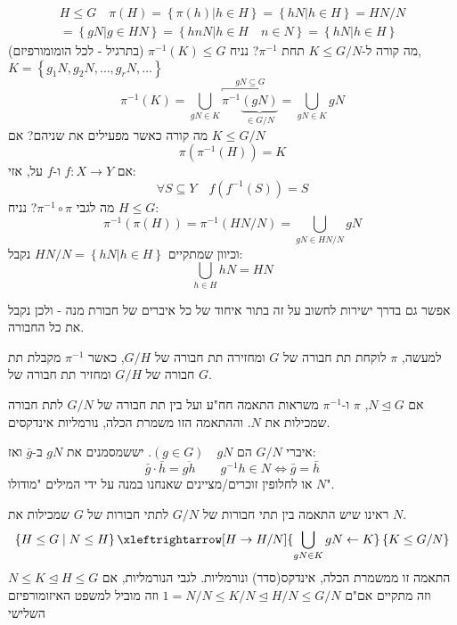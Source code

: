 \documentclass{tstextbook}
\begin{document}
$$\begin{gather}H\leq G\quad \pi(H)=\left\{  \pi(h)|h\in H  \right\}=\left\{  hN | h\in H  \right\}=HN / N  \\= \left\{  gN |g\in HN  \right\}= \left\{  hnN | h \in H\quad n\in N  \right\}=\left\{  hN|h\in H  \right\}
\end{gather}$$
מה קורה ל-\(K\leq G/N\) תחת \(\pi ^{-1}\)? נניח \(\pi ^{-1}(K)\leq G\) (בתרגיל - לכל הומומורפיזם), \(K=\left\{  g_{1}N,g_{2}N, \dots,g_{r}N, \dots  \right\}\)$$\pi ^{-1} (K)=\bigcup_{gN\in K} \overbracket{ \pi ^{-1} \underbrace{ (gN) }_{ \in G/N } }^{ gN\subseteq G }=\bigcup_{gN\in K}gN$$
מה קורה כאשר מפעילים את שניהם? אם \(K\leq G / N\)$$\pi\left( \pi ^{-1} (H) \right)=K$$
אם \(f:X\to Y\) ו-\(f\) על, אזי:
$$\forall S\subseteq Y\quad f(f^{-1} (S))=S$$
מה לגבי \(\pi ^{-1} \circ \pi\)? נניח \(H\leq G\):
$$\pi ^{-1} \left( \pi(H) \right)=\pi ^{-1} (HN / N)=\bigcup_{gN\in HN / N} gN $$
וכיוון שמתקיים \(HN / N=\left\{  hN | h\in H  \right\}\) נקבל:
$$\bigcup_{h \in H} hN=HN$$

\begin{remark}
אפשר גם בדרך ישירות לחשוב על זה בתור איחוד של כל איברים של חבורת מנה - ולכן נקבל את כל החבורה.

\end{remark}
למעשה, \(\pi\) לוקחת תת חבורה של \(G\) ומחזירה תת חבורה של \(G / H\), כאשר \(\pi ^{-1}\) מקבלת תת חבורה של \(G / H\) ומחזיר תת חבורה של \(G\).

\begin{theorem}
אם \(N\trianglelefteq G\), \(\pi\) ו-\(\pi ^{-1}\) משראות התאמה חח"ע ועל בין תת חבורה של \(G / N\) לתת חבורה שמכילות את \(N\). וההתאמה הזו משמרת הכלה, נורמליות אינדקסים.

\end{theorem}
\begin{symbolize}
איברי \(G / N\) הם \(\left( g\in G \right)\quad gN\). יששמסמנים את \(gN\) ב-\(\bar{g}\) ואז:
$$\bar{g}\cdot \bar{h}=\overline{gh}\qquad g^{-1} h\in N\iff \bar{g}=\bar{h}$$
או לחלופין זוכרים/מציינים שאנחנו במנה על ידי המילים "מודולו \(N\)".

\end{symbolize}
ראינו שיש התאמה בין תתי חבורות של \(G/N\) לתתי חבורות של \(G\) שמכילות את \(N\).
$$\left\{  H\leq G \mid N\leq H  \right\}\xleftrightarrow[H\to H/N  ]{\bigcup_{gN\in K} gN\leftarrow K} \left\{  K\leq G / N \right\}$$
התאמה זו ממשמרת הכלה, אינדקס(סדר) ונורמליות. לגבי הנורמליות, אם \(N\leq K\trianglelefteq H\leq G\) וזה מתקיים אם"ם \(1=N / N\leq K / N \trianglelefteq H / N \leq G / N\) וזה מוביל למשפט האיזומורפיזם השלישי
\end{document}
